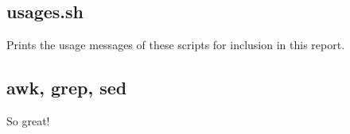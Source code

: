 \documentclass{article}
\begin{document}
\begin{framed}
    \label{lst:minions}
    
\end{framed}

\subsection{usages.sh} \label{tool:usages}
Prints the usage messages of these scripts for inclusion in this report.
\begin{framed}
    \label{lst:usages}
    
\end{framed}


\subsection{awk, grep, sed}
So great!
\end{document}
